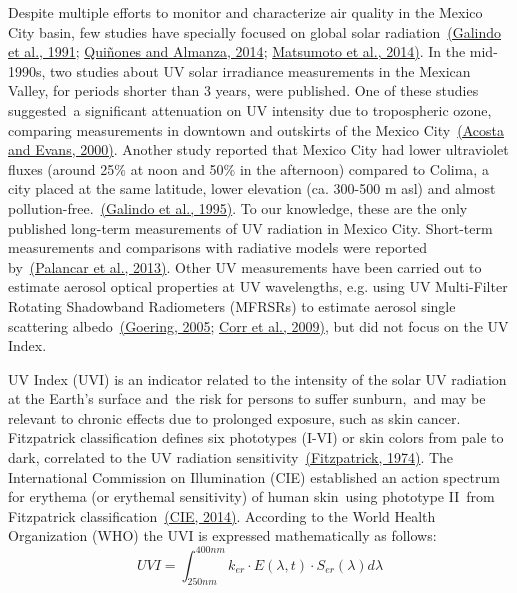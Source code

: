 \documentclass[10pt]{article}
\begin{document}
Despite multiple efforts to monitor and characterize air quality in the
Mexico City basin, few studies have specially focused on global solar
radiation~\hyperref[csl:15]{(Galindo et al., 1991}; \hyperref[csl:16]{Qui{\~{n}}ones and Almanza, 2014}; \hyperref[csl:17]{Matsumoto et al., 2014)}. In the mid-1990s, two studies about UV
solar irradiance measurements in the Mexican Valley, for periods shorter
than 3 years, were published. One of these studies suggested~a
significant attenuation on UV intensity due to tropospheric ozone,
comparing measurements in downtown and outskirts of the Mexico
City~\hyperref[csl:18]{(Acosta and Evans, 2000)}. Another study reported that Mexico City had
lower ultraviolet fluxes (around 25\% at noon and 50\% in the afternoon)
compared to Colima, a city placed at the same latitude, lower elevation
(ca. 300-500 m asl) and almost pollution-free.~\hyperref[csl:19]{(Galindo et al., 1995)}. To
our knowledge, these are the only published long-term measurements of UV
radiation in Mexico City. Short-term measurements and comparisons with
radiative models were reported by~\hyperref[csl:13]{(Palancar et al., 2013)}. Other UV
measurements have been carried out to estimate aerosol optical
properties at UV wavelengths, e.g. using UV Multi-Filter Rotating
Shadowband Radiometers (MFRSRs) to estimate aerosol single scattering
albedo~\hyperref[csl:20]{(Goering, 2005}; \hyperref[csl:21]{Corr et al., 2009)}, but did not focus on the UV Index. ~

UV Index (UVI) is an indicator related to the intensity of the solar UV
radiation at the Earth's surface and~the risk for persons to suffer
sunburn,~and may be relevant to chronic effects due to prolonged
exposure, such as skin cancer. Fitzpatrick classification defines six
phototypes (I-VI) or skin colors from pale to dark, correlated to the UV
radiation sensitivity~\hyperref[csl:22]{(Fitzpatrick, 1974)}. The International Commission
on Illumination (CIE) established an action spectrum for erythema (or
erythemal sensitivity) of human skin~using phototype II~from Fitzpatrick
classification~\hyperref[csl:23]{(CIE, 2014)}. According to the World Health
Organization (WHO) the UVI is expressed mathematically as
follows:
\begin{equation}
UVI=\int_{250nm}^{400nm}k_{er}\cdot E(\lambda,t)\cdot S_{er}\left(\lambda\right)d\lambda
\end{equation}
\end{document}
